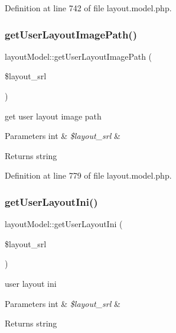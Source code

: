 Definition at line 742 of file layout.\+model.\+php.

\mbox{\label{classlayoutModel_a8d7574bcc9329207e6cc1eb2da163288}} 
\subsubsection{\texorpdfstring{get\+User\+Layout\+Image\+Path()}{getUserLayoutImagePath()}}
{\footnotesize\ttfamily layout\+Model\+::get\+User\+Layout\+Image\+Path (\begin{DoxyParamCaption}\item[{}]{\$layout\+\_\+srl }\end{DoxyParamCaption})}

get user layout image path 
\begin{DoxyParams}[1]{Parameters}
int & {\em \$layout\+\_\+srl} & \\
\hline
\end{DoxyParams}
\begin{DoxyReturn}{Returns}
string 
\end{DoxyReturn}


Definition at line 779 of file layout.\+model.\+php.

\mbox{\label{classlayoutModel_ae52b6a4a0f82631f23b6af7603c0a30e}} 
\subsubsection{\texorpdfstring{get\+User\+Layout\+Ini()}{getUserLayoutIni()}}
{\footnotesize\ttfamily layout\+Model\+::get\+User\+Layout\+Ini (\begin{DoxyParamCaption}\item[{}]{\$layout\+\_\+srl }\end{DoxyParamCaption})}

user layout ini 
\begin{DoxyParams}[1]{Parameters}
int & {\em \$layout\+\_\+srl} & \\
\hline
\end{DoxyParams}
\begin{DoxyReturn}{Returns}
string 
\end{DoxyReturn}


